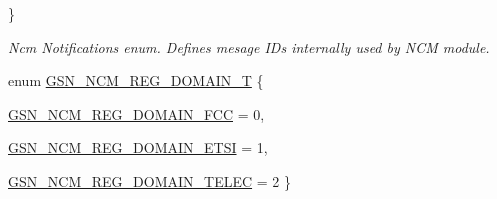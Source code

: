 \begin{DoxyCompactItemize}
 \}
\begin{DoxyCompactList}\small\item\em Ncm Notifications enum. Defines mesage IDs internally used by NCM module. \end{DoxyCompactList}\item 
enum \hyperlink{a00529_a0b425c0b83594b7c2c4fef04ac90fa69}{GSN\_\-NCM\_\-REG\_\-DOMAIN\_\-T} \{ \par
\hyperlink{a00529_a0b425c0b83594b7c2c4fef04ac90fa69a4f639a29533dc8e681c9417b158ae959}{GSN\_\-NCM\_\-REG\_\-DOMAIN\_\-FCC} =  0, 
\par
\hyperlink{a00529_a0b425c0b83594b7c2c4fef04ac90fa69af8ef035ca60ffa6afe2e029b208c7d66}{GSN\_\-NCM\_\-REG\_\-DOMAIN\_\-ETSI} =  1, 
\par
\hyperlink{a00529_a0b425c0b83594b7c2c4fef04ac90fa69ac325df2f36eec4925d7a565cd0fa48a8}{GSN\_\-NCM\_\-REG\_\-DOMAIN\_\-TELEC} =  2
 \}
\end{DoxyCompactItemize}
